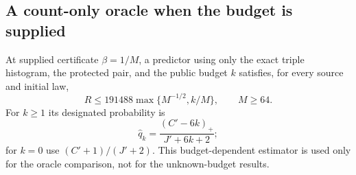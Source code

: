 \subsection{A count-only oracle when the budget is supplied}

\begin{proposition}\label{prop:count-oracle}
At supplied certificate $\beta=1/M$, a predictor using only the exact
triple histogram, the protected pair, and the public budget $k$ satisfies,
for every source and initial law,
\[
 R\le191488\max\{M^{-1/2},k/M\},\qquad M\ge64.
\]
For $k\ge1$ its designated probability is
\[
 \widehat q_k=\frac{(C'-6k)_+}{J'+6k+2};
\]
for $k=0$ use $(C'+1)/(J'+2)$.  This budget-dependent estimator is used
only for the oracle comparison, not for the unknown-budget results.
\end{proposition}
